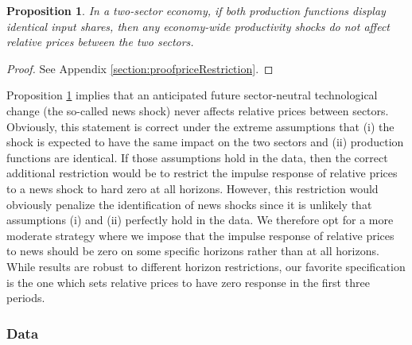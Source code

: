 \documentclass[12pt]{article}
\newtheorem{prop}{Proposition}
\begin{document}
\begin{prop}\label{prop:priceRestriction}
In a two-sector economy, if both production functions display identical input shares, then any economy-wide productivity shocks do not affect relative prices between the two sectors.
\end{prop}
\begin{proof}
	See Appendix \ref{section:proofpriceRestriction}.
\end{proof}

Proposition \ref{prop:priceRestriction} implies that an anticipated future sector-neutral technological change (the so-called news shock) never affects relative prices between sectors. Obviously, this statement is correct under the extreme assumptions that (i) the shock is expected to have the same impact on the two sectors and (ii) production functions are identical. If those assumptions hold in the data, then the correct additional restriction would be to  restrict the impulse response of relative prices to a news shock to hard zero at all horizons. However, this restriction would obviously penalize the identification of news shocks since it is unlikely that assumptions (i) and (ii) perfectly hold in the data. We therefore opt for a more moderate strategy where we impose that the impulse response of relative prices to news should be zero on some specific horizons rather than at all horizons. While results are robust to different horizon restrictions, our favorite specification is the one which sets relative prices to have zero response in the first three periods. 

\subsubsection*{Data}
\end{document}
